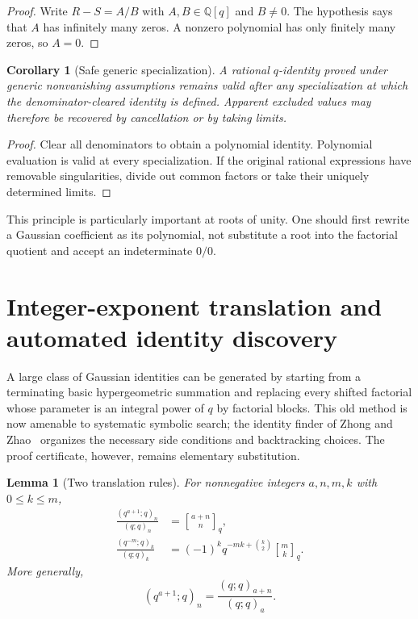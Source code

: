 \documentclass[11pt,oneside,openany]{book}
\newtheorem{lemma}[theorem]{Lemma}
\newtheorem{corollary}[theorem]{Corollary}
\theoremstyle{definition}
\theoremstyle{remark}
\newcommand{\Qbinom}[3]{\genfrac{[}{]}{0pt}{}{#1}{#2}_{#3}}
\newcommand{\Q}{\mathbb Q}
\begin{document}
\begin{proof}
Write $R-S=A/B$ with $A,B\in\Q[q]$ and $B\ne0$.  The hypothesis says that $A$ has infinitely many zeros.  A nonzero polynomial has only finitely many zeros, so $A=0$.
\end{proof}

\begin{corollary}[Safe generic specialization]\label{cor:safe-specialization}
A rational $q$-identity proved under generic nonvanishing assumptions remains valid after any specialization at which the denominator-cleared identity is defined.  Apparent excluded values may therefore be recovered by cancellation or by taking limits.
\end{corollary}

\begin{proof}
Clear all denominators to obtain a polynomial identity.  Polynomial evaluation is valid at every specialization.  If the original rational expressions have removable singularities, divide out common factors or take their uniquely determined limits.
\end{proof}

This principle is particularly important at roots of unity.  One should first rewrite a Gaussian coefficient as its polynomial, not substitute a root into the factorial quotient and accept an indeterminate $0/0$.

\section{Integer-exponent translation and automated identity discovery}\label{sec:identity-discovery}

A large class of Gaussian identities can be generated by starting from a terminating basic hypergeometric summation and replacing every shifted factorial whose parameter is an integral power of $q$ by factorial blocks.  This old method is now amenable to systematic symbolic search; the identity finder of Zhong and Zhao~\cite{ZhongZhao2026} organizes the necessary side conditions and backtracking choices.  The proof certificate, however, remains elementary substitution.

\begin{lemma}[Two translation rules]\label{lem:integer-qpochhammer-translation}
For nonnegative integers $a,n,m,k$ with $0\le k\le m$,
\begin{align}
 \frac{(q^{a+1};q)_n}{(q;q)_n}
 &=\Qbinom{a+n}{n}{q},
 \label{eq:positive-integer-translation}\\
 \frac{(q^{-m};q)_k}{(q;q)_k}
 &=(-1)^kq^{-mk+\binom k2}\Qbinom{m}{k}{q}.
 \label{eq:negative-integer-translation}
\end{align}
More generally,
\begin{equation}\label{eq:factorial-block-translation}
 (q^{a+1};q)_n=\frac{(q;q)_{a+n}}{(q;q)_a}.
\end{equation}
\end{lemma}
\end{document}
